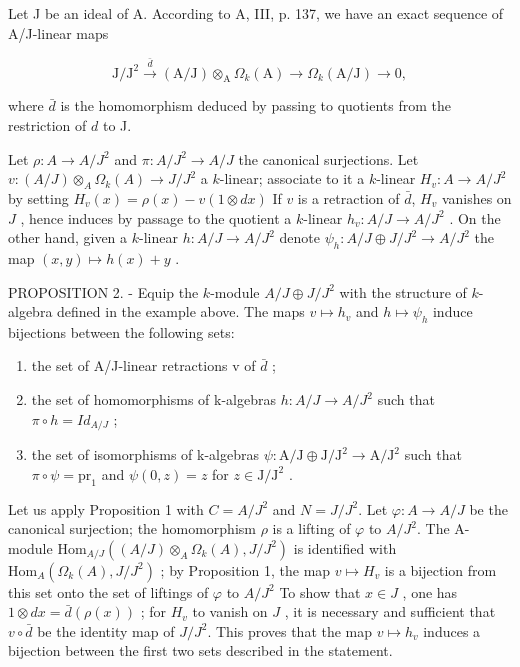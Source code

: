 Let J be an ideal of A. According to A, III, p. 137, we have an exact sequence of A/J-linear maps

\[
\mathrm{J} / \mathrm{J} ^ {2} \stackrel {\bar {d}} {\longrightarrow} (\mathrm{A} / \mathrm{J}) \otimes_ {\mathrm{A}} \Omega_ {k} (\mathrm{A}) \longrightarrow \Omega_ {k} (\mathrm{A} / \mathrm{J}) \rightarrow 0,
\]

where \(\bar{d}\) is the homomorphism deduced by passing to quotients from the restriction of \(d\) to J.

Let \(\rho : A \to A/J^{2}\) and \(\pi : A/J^{2} \to A/J\) the canonical surjections. Let \(v : (A/J) \otimes_{A} \Omega_{k}(A) \longrightarrow J/J^{2}\) a \(k\)-linear; associate to it a \(k\)-linear \(H_{v} : A \to A/J^{2}\) by setting \(H_{v}(x) = \rho(x) - v(1 \otimes dx)\) If \(v\) is a retraction of \(\bar{d}\), \(H_{v}\) vanishes on \(J\) , hence induces by passage to the quotient a \(k\)-linear \(h_{v} : A/J \to A/J^{2}\) . On the other hand, given a \(k\)-linear \(h : A/J \to A/J^{2}\) denote \(\psi_{h} : A/J \oplus J/J^{2} \longrightarrow A/J^{2}\) the map \((x,y) \mapsto h(x)+y\) .

PROPOSITION 2. - Equip the \(k\)-module \(A / J \oplus J / J^2\) with the structure of \(k\)-algebra defined in the example above. The maps \(v \mapsto h_v\) and \(h \mapsto \psi_h\) induce bijections between the following sets:

\begin{enumerate}
\def\labelenumi{(\roman{enumi})}
\item
  the set of A/J-linear retractions v of \(\bar{d}\) ;
\item
  the set of homomorphisms of k-algebras \(h: A/J \to A/J^{2}\) such that \(\pi \circ h = Id_{A/J}\) ;
\item
  the set of isomorphisms of k-algebras \(\psi : \mathrm{A} / \mathrm{J} \oplus \mathrm{J} / \mathrm{J}^2 \longrightarrow \mathrm{A} / \mathrm{J}^2\) such that \(\pi \circ \psi = \mathrm{pr}_1\) and \(\psi(0, z) = z\) for \(z \in \mathrm{J} / \mathrm{J}^2\) .
\end{enumerate}

Let us apply Proposition 1 with \(C = A / J^2\) and \(N = J / J^2\). Let \(\varphi : A \to A / J\) be the canonical surjection; the homomorphism \(\rho\) is a lifting of \(\varphi\) to \(A / J^2\). The A-module \(\text{Hom}_{A / J}((A / J) \otimes_A \Omega_k(A), J / J^2)\) is identified with \(\text{Hom}_A(\Omega_k(A), J / J^2)\) ; by Proposition 1, the map \(v \mapsto H_v\) is a bijection from this set onto the set of liftings of \(\varphi\) to \(A / J^2\) To show that \(x \in J\) , one has \(1 \otimes dx = \bar{d}(\rho(x))\) ; for \(H_v\) to vanish on \(J\) , it is necessary and sufficient that \(v \circ \bar{d}\) be the identity map of \(J / J^2\). This proves that the map \(v \mapsto h_v\) induces a bijection between the first two sets described in the statement.

